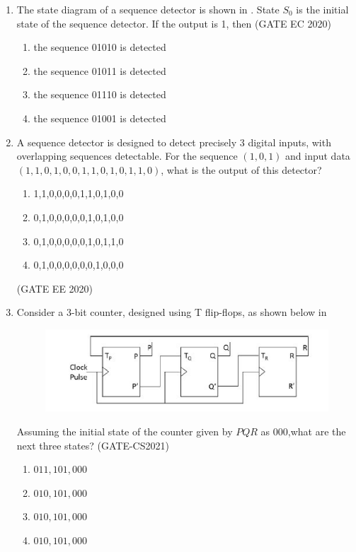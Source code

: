\begin{enumerate}[label=\arabic*.,ref=\theenumi]
\item 	The state diagram of a sequence detector is shown in
  .
		 State $S_0$ is the initial state of the sequence detector. If the output is 1, then
\hfill (GATE EC 2020)
	\begin{figure}[H]
    \centering
    \resizebox{0.75\columnwidth}{!}{%
  
		}
  \caption{}
  \label{fig:gate/ec/2020/39/1}		
  \end{figure}	 
\begin{enumerate}
 \item the sequence 01010 is detected
 \item the sequence 01011 is detected
 \item the sequence 01110 is detected
 \item the sequence 01001 is detected	 
\end{enumerate}	
\item A sequence detector is designed to detect precisely 3 digital inputs, with overlapping sequences detectable. For the sequence $(1,0,1)$ and input data $(1,1,0,1,0,0,1,1,0,1,0,1,1,0)$, what is the output of this detector?
		\begin{enumerate}
			\item 1,1,0,0,0,0,1,1,0,1,0,0
			\item 0,1,0,0,0,0,0,1,0,1,0,0
			\item 0,1,0,0,0,0,0,1,0,1,1,0
			\item 0,1,0,0,0,0,0,0,1,0,0,0
		\end{enumerate}
		\hfill (GATE EE 2020)
\item Consider a $3$-bit counter, designed using T flip-flops, as shown below
in 
     \begin{figure}[H]
\centering
\includegraphics[width=0.75\columnwidth]{ide/fsm/figs/3bitcounter.jpg}
\caption{}
\label{fig:3bitcounter.jpg}
\end{figure}
Assuming the initial state of the counter given by $PQR$ as $000$,what are the next three states?
                 \hfill(GATE-CS2021)
\begin{enumerate}[label=(\Alph*)]
\item $011, 101, 000$
\item $010, 101, 000$
\item $010, 101, 000$
\item $010, 101, 000$
\end{enumerate}


\end{enumerate}
